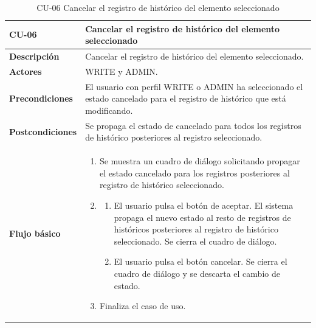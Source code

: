 \begin{table} [H]
    \centering
    \setlength{\leftmargini}{0.4cm}
	\resizebox{14cm}{!} { %
    \begin{tabular}{| m{3cm} | m{11cm} |}   
    \hline
	  \textbf{CU-06} & \textbf{Cancelar el registro de histórico del elemento seleccionado} \\\hline
	  \textbf{Descripción} & Cancelar el registro de histórico del elemento seleccionado. \\\hline
	  \textbf{Actores} & WRITE y ADMIN. \\\hline
	  \textbf{Precondiciones} & El usuario con perfil WRITE o ADMIN ha seleccionado el estado cancelado para el registro de histórico que está modificando. \\\hline
	  \textbf{Postcondiciones} & Se propaga el estado de cancelado para todos los registros de histórico posteriores al registro seleccionado. \\\hline
	  \textbf{Flujo básico} & 
		\begin{enumerate}
	  	\item Se muestra un cuadro de diálogo solicitando propagar el estado cancelado para los registros posteriores al registro de histórico seleccionado.
        \item 
			\begin{enumerate}	
			   \item El usuario pulsa el botón de aceptar. El sistema propaga el nuevo estado al resto de registros de históricos posteriores al registro de histórico seleccionado. Se cierra el cuadro de diálogo.
			   \item El usuario pulsa el botón cancelar. Se cierra el cuadro de diálogo y se descarta el cambio de estado.
			\end{enumerate}
	  \item Finaliza el caso de uso.
	  \end{enumerate} 	  	  
	  \\\hline
    \end{tabular}
    } %
    \caption{CU-06 Cancelar el registro de histórico del elemento seleccionado}
    \label{tab:cu-cancelar-historico}
\end{table}


